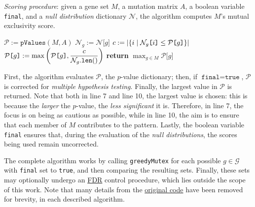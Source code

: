 \begin{algorithm}[H]
    \caption{
        \textit{Scoring procedure}: given a gene set $M$, a mutation matrix $A$, a boolean variable \texttt{final}, and a \textit{null distribution} dictionary $\mathcal N$, the algorithm computes $M$'s mutual exclusivity score.
    }

        \label{score_mutex}
    \begin{algorithmic}[1]
            \State $\mathcal P := \texttt{pValues}(M, A)$
             
                    \State $\mathcal N_g := \mathcal N\texttt{[}g\texttt{]}$
                    \State $c := \left|\{i \mid \mathcal N_g\texttt{[}i\texttt{]} \le \mathcal P \texttt{[}g\texttt{]}\}\right|$
                    \State $\mathcal P\texttt{[}g\texttt{]} := \max\left(\mathcal P\texttt{[}g\texttt{]}, \dfrac{c}{\mathcal N_g.\texttt{len}()}\right)$
                \EndFor
            \EndIf
            \State \textbf{return} $\max_{g \in M}{\mathcal P\texttt{[}g\texttt{]}}$ 
        \EndFunction
    \end{algorithmic}
\end{algorithm}

First, the algorithm evaluates $\mathcal P$, the $p$-value dictionary; then, if $\texttt{final} = \texttt{true}$, $\mathcal P$ is corrected for \textit{multiple hypothesis testing}. Finally, the largest value in $\mathcal P$ is returned. Note that both in line 7 and line 10, the largest value is chosen: this is because the \textit{larger} the $p$-value, the \textit{less significant} it is. Therefore, in line 7, the focus is on being as cautious as possible, while in line 10, the aim is to ensure that each member of $M$ contributes to the pattern. Lastly, the boolean variable \texttt{final} ensures that, during the evaluation of the \textit{null distributions}, the scores being used remain uncorrected.

The complete algorithm works by calling \texttt{greedyMutex} for each possible $g \in \mathcal G$ with \texttt{final} set to \texttt{true}, and then comparing the resulting sets. Finally, these sets may optionally undergo an \href{https://en.wikipedia.org/wiki/False_discovery_rate}{FDR} control procedure, which lies outside the scope of this work. Note that many details from the \href{https://github.com/PathwayAndDataAnalysis/mutex}{original code} have been removed for brevity, in each described algorithm.

